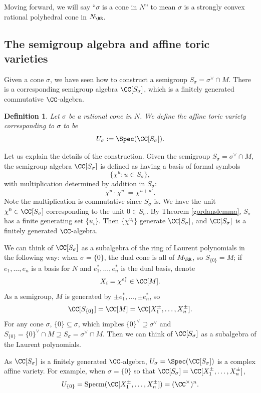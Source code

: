 \documentclass[12pt]{amsart}
\theoremstyle{plain}
\newtheorem{definition}[theorem]{Definition}
\begin{document}
Moving forward, we will say ``$\sigma$ is a cone in $N$'' to mean $\sigma$ is a strongly convex rational polyhedral cone in $N_\RR$.

\subsection{The semigroup algebra and affine toric varieties}
Given a cone $\sigma$, we have seen how to construct a semigroup $S_\sigma = \sigma^\vee \cap M$.
There is a corresponding semigroup algebra $\CC[S_\sigma]$, which is a finitely generated commutative $\CC$-algebra.

\begin{definition}
Let $\sigma$ be a rational cone in $N$.
We define the affine toric variety corresponding to $\sigma$ to be
$$U_\sigma := \Spec(\CC[S_\sigma]).$$
\end{definition}

Let us explain the details of the construction.
Given the semigroup $S_\sigma = \sigma^\vee \cap M$, the semigroup algebra $\CC[S_\sigma]$ is defined as having a basis of formal symbols
$$\{\chi^u : u \in S_\sigma\},$$
with multiplication determined by addition in $S_\sigma$:
$$\chi^u \cdot \chi^{u'} = \chi^{u + u'}.$$
Note the multiplication is commutative since $S_\sigma$ is.
We have the unit $\chi^0 \in \CC[S_\sigma]$ corresponding to the unit $0 \in S_\sigma$.
By Theorem \ref{gordanslemma}, $S_\sigma$ has a finite generating set $\{u_i\}$.
Then $\{\chi^{u_i}\}$ generate $\CC[S_\sigma]$, and $\CC[S_\sigma]$ is a finitely generated $\CC$-algebra.

We can think of $\CC[S_\sigma]$ as a subalgebra of the ring of Laurent polynomials in the following way:
when $\sigma = \{0\}$, the dual cone is all of $M_\RR$, so $S_{\{0\}} = M$;
if $e_1, \ldots, e_n$ is a basis for $N$ and $e_1^*, \ldots, e_n^*$ is the dual basis, denote
$$X_i = \chi^{e_i^*} \in \CC[M].$$
As a semigroup, $M$ is generated by $\pm e_1^*, \ldots, \pm e_n^*$, so
$$\CC[S_{\{0\}}] = \CC[M] = \CC[X_1^\pm, \ldots, X_n^\pm].$$
For any cone $\sigma$, $\{0\} \subseteq \sigma$, which implies $\{0\}^\vee \supseteq \sigma^\vee$ and $S_{\{0\}} = \{0\}^\vee \cap M \supseteq S_\sigma = \sigma^\vee \cap M.$
Then we can think of $\CC[S_\sigma]$ as a subalgebra of the Laurent polynomials.

As $\CC[S_\sigma]$ is a finitely generated $\CC$-algebra, $U_\sigma = \Spec(\CC[S_\sigma])$ is a complex affine variety.
For example, when $\sigma = \{0\}$ so that $\CC[S_\sigma] = \CC[X_1^\pm, \ldots, X_n^\pm]$, 
$$U_{\{0\}} = \mathrm{Specm}(\CC[X_1^\pm, \ldots, X_n^\pm]) = (\CC^\times)^n.$$
\end{document}
